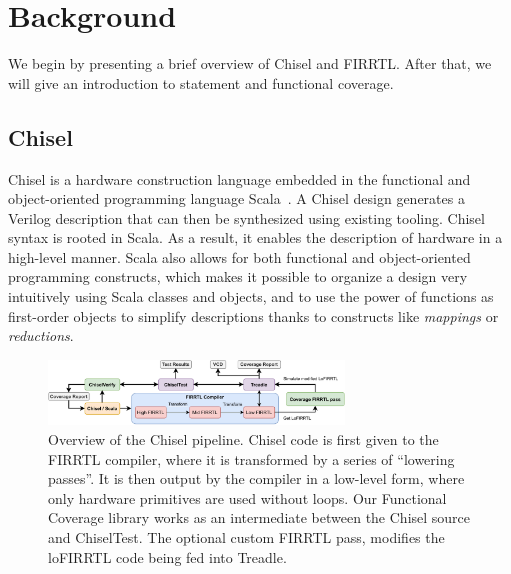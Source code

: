 \documentclass[conference]{IEEEtran}
\newcommand{\martin}[1]{{\color{blue} Martin: #1}}
\begin{document}
\section{Background}
\label{sec:background}
We begin by presenting a brief overview of Chisel and FIRRTL. 
After that, we will give an introduction to statement and functional coverage.


\subsection{Chisel}
Chisel is a hardware construction language embedded in the functional and object-oriented programming language Scala~\cite{chisel:dac2012, chisel:book, Scala}. 
A Chisel design generates a Verilog description that can then be synthesized using existing tooling. 
Chisel syntax is rooted in Scala. As a result, it enables the description of hardware in a high-level manner. 
Scala also allows for both functional and object-oriented programming constructs, which makes it possible to organize a design very intuitively using Scala classes and objects, and to use the power of functions as first-order objects to simplify descriptions thanks to constructs like \textit{mappings} or \textit{reductions}.

\begin{figure}[t]
    \centering
    \includegraphics[trim=0 0.3cm 0 0.3cm, width=0.7\textwidth]{Chisel_FIRRTL_VERILOG_Coverage.pdf}
    \caption{Overview of the Chisel pipeline. Chisel code is first given to the FIRRTL compiler, where it is transformed by a series of ``lowering passes''. It is then output by the compiler in a low-level form, where only hardware primitives are used without loops. Our Functional Coverage library works as an intermediate between the Chisel source and ChiselTest. The optional custom FIRRTL pass, modifies the loFIRRTL code being fed into Treadle.}
\label{fig:chisel}
\end{figure}
\end{document}
